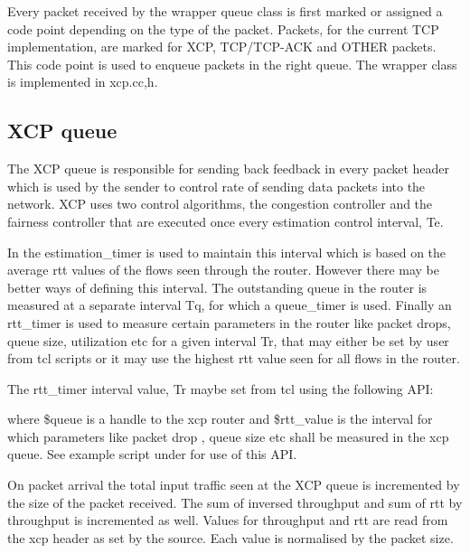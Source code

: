     Every packet received by the wrapper queue class is first marked or
    assigned a code point depending on the type of the packet. Packets,
    for the current TCP implementation, are marked for XCP, TCP/TCP-ACK
    and OTHER packets. This code point is used to enqueue packets in the right
    queue. The wrapper class is implemented in xcp.{cc,h}.
    
    
    \subsection{XCP queue}
    \label{sec:xcp_queue}

    The XCP queue is responsible for sending back feedback in every packet
    header which is used by the sender to control rate of sending data
    packets into the network. XCP uses two control algorithms, the
    congestion controller and the fairness controller that are executed
    once every estimation control interval, Te. 

    In \ns{}  the
    estimation\_timer is used to maintain this interval which is based on
    the average rtt values of the flows seen through the router. However
    there may be better ways of defining this interval. The outstanding
    queue in the router is measured at a separate interval Tq, for which a
    queue\_timer is used. Finally an rtt\_timer is used to measure certain
    parameters in the router like packet drops, queue size, utilization 
    etc for a given interval Tr, that may either be set by user from tcl
    scripts or it may use the highest rtt value seen for all flows in the
    router. 

    The rtt\_timer interval value, Tr maybe set from tcl using the
    following API: 
    
    
    where \$queue is a handle to the xcp router and \$rtt\_value is the
    interval for which parameters like packet drop , queue size etc
    shall be measured in the xcp queue. See example script under
     for use of
    this API.
    
    On packet arrival the total input traffic seen at the XCP queue is
    incremented by the size of the packet received. The sum of inversed
    throughput and sum of rtt by throughput is incremented as
    well. Values for throughput and rtt are read from the xcp header as
    set by the source. Each value is normalised by the packet size.
    
